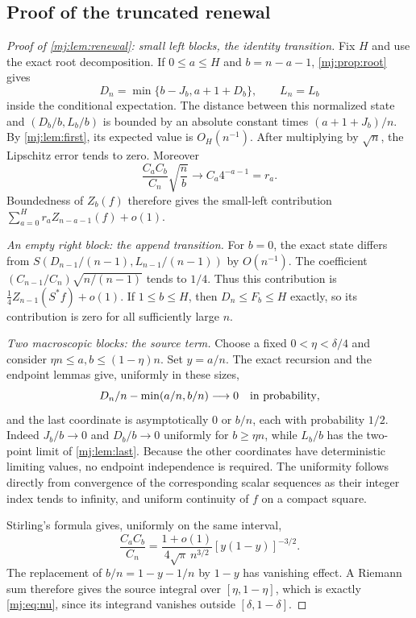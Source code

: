 \documentclass[11pt,a4paper]{article}
\theoremstyle{definition}\newaliascnt{definition}{theorem}
\theoremstyle{remark}\newaliascnt{remark}{theorem}
\begin{document}
\subsection{Proof of the truncated renewal}
\begin{proof}[Proof of \cref{mj:lem:renewal}: small left blocks, the identity transition]
Fix $H$ and use the exact root decomposition. If $0\le a\le H$ and
$b=n-a-1$, \cref{mj:prop:root} gives
\[
 D_n=\min\{b-J_b,a+1+D_b\},\qquad L_n=L_b
\]
inside the conditional expectation. The distance between this normalized
state and $(D_b/b,L_b/b)$ is bounded by an absolute constant times
$(a+1+J_b)/n$. By \cref{mj:lem:first}, its expected value is $O_H(n^{-1})$.
After multiplying by $\sqrt n$, the Lipschitz error tends to zero. Moreover
\[
 \frac{C_aC_b}{C_n}\sqrt{\frac nb}\longrightarrow C_a4^{-a-1}=r_a.
\]
Boundedness of $Z_b(f)$ therefore gives the small-left contribution
$\sum_{a=0}^H r_aZ_{n-a-1}(f)+o(1)$.

\emph{An empty right block: the append transition.}
For $b=0$, the exact state differs from
$S(D_{n-1}/(n-1),L_{n-1}/(n-1))$ by $O(n^{-1})$. The coefficient
$(C_{n-1}/C_n)\sqrt{n/(n-1)}$ tends to $1/4$. Thus this contribution is
$\frac14 Z_{n-1}(S^\ast f)+o(1)$. If $1\le b\le H$, then $D_n\le F_b\le H$
exactly, so its contribution is zero for all sufficiently large $n$.

\emph{Two macroscopic blocks: the source term.}
Choose a fixed $0<\eta<\delta/4$ and consider $\eta n\le a,b\le(1-\eta)n$.
Set $y=a/n$. The exact recursion and the endpoint lemmas give, uniformly in
these sizes,
\[
 D_n/n-\min(a/n,b/n)\longrightarrow0
 \quad\hbox{in probability},
\]
and the last coordinate is asymptotically $0$ or $b/n$, each with
probability $1/2$. Indeed $J_b/b\to0$ and $D_b/b\to0$ uniformly for
$b\ge\eta n$, while $L_b/b$ has the two-point limit of \cref{mj:lem:last}.
Because the other coordinates have deterministic limiting values, no
endpoint independence is required. The uniformity follows directly from
convergence of the corresponding scalar sequences as their integer index
tends to infinity, and uniform continuity of $f$ on a compact square.

Stirling's formula gives, uniformly on the same interval,
\begin{equation}
 \frac{C_aC_b}{C_n}
 =\frac{1+o(1)}{4\sqrt\pi\,n^{3/2}}
   [y(1-y)]^{-3/2}.
 \label{mj:eq:split-asymptotic-10}
\end{equation}
The replacement of $b/n=1-y-1/n$ by $1-y$ has vanishing effect. A Riemann
sum therefore gives the source integral over $[\eta,1-\eta]$, which is
exactly \eqref{mj:eq:nu}, since its integrand vanishes outside
$[\delta,1-\delta]$.


\end{proof}
\end{document}
